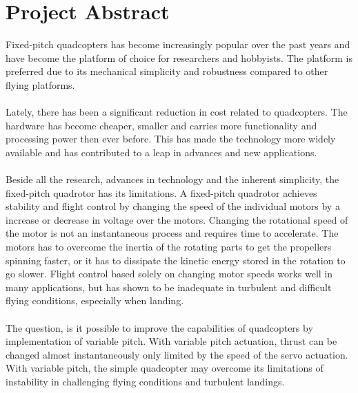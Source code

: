 \section*{Project Abstract}

Fixed-pitch quadcopters has become increasingly popular over the past years and have become the platform of choice for researchers and hobbyists. The platform is preferred due to its mechanical simplicity and robustness compared to other flying platforms. 
\\\\
Lately, there has been a significant reduction in cost related to quadcopters. The hardware has become cheaper, smaller and carries more functionality and processing power then ever before. This has made the technology more widely available and has contributed to a leap in advances and new applications. 
\\\\
Beside all the research, advances in technology and the inherent simplicity, the fixed-pitch quadrotor has its limitations. A fixed-pitch quadrotor achieves stability and flight control by changing the speed of the individual motors by a increase or decrease in voltage over the motors. Changing the rotational speed of the motor is not an instantaneous process and requires time to accelerate. The motors has to overcome the inertia of the rotating parts to get the propellers spinning faster, or it has to dissipate the kinetic energy stored in the rotation to go slower. Flight control based solely on changing motor speeds works well in many applications, but has shown to be inadequate in turbulent and difficult flying conditions, especially when landing. 
\\\\
The question, is it possible to improve the capabilities of quadcopters by implementation of variable pitch. With variable pitch actuation, thrust can be changed almost instantaneously only limited by the speed of the servo actuation. With variable pitch, the simple quadcopter may overcome its limitations of instability in challenging flying conditions and turbulent landings. 


